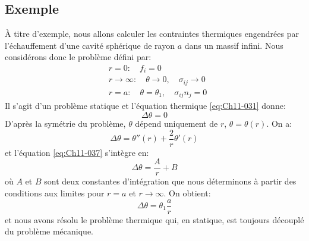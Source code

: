\subsection{Exemple}\label{ssec:Ch11-2.2}
\`A titre d'exemple, nous allons calculer les contraintes thermiques engendrées par l'échauffement d'une cavité sphérique de rayon $a$ dans un massif infini.
Nous considérons donc le problème défini par: 
\begin{subequations}
\begin{align}
&    r=0:\quad f_i = 0
    \label{eq:Ch11-034}\\
&   r \rightarrow \infty: \quad \theta \rightarrow 0,\quad \sigma_{ij}\rightarrow 0
    \label{eq:Ch11-035}\\
&    r =a: \quad \theta=\theta_1,\quad \sigma_{ij}n_j = 0\label{eq:Ch11-036}
\end{align}
\end{subequations}
Il s'agit d'un problème statique et l'équation thermique \eqref{eq:Ch11-031} donne: 
\begin{equation}
    \Delta \theta = 0
    \label{eq:Ch11-037}
\end{equation}
D'après la symétrie du problème, $\theta$ dépend uniquement de $r$, $\theta=\theta(r)$.
On a: 
\begin{equation}
    \Delta \theta = \theta''(r) +\frac{2}{r}\theta'(r)
    \label{eq:Ch11-038}
\end{equation}
et l'équation \eqref{eq:Ch11-037} s'intègre en: 
\begin{equation}
    \Delta \theta = \frac{A}{r} + B
    \label{eq:Ch11-039}
\end{equation}
où $A$ et $B$ sont deux constantes d'intégration que nous déterminons à partir des conditions aux limites pour $r= a$ et $r \rightarrow \infty$.
On obtient:
\begin{equation}
    \Delta \theta = \theta_1\frac{a}{r}
    \label{eq:Ch11-040}
\end{equation}
et nous avons résolu le problème thermique qui, en statique, est toujours découplé du problème mécanique. 

